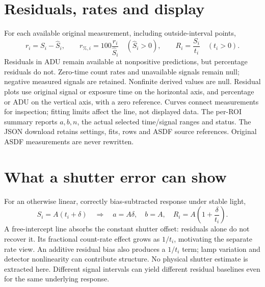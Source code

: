 \documentclass[11pt,a4paper]{article}
\begin{document}
\section{Residuals, rates and display}
For each available original measurement, including outside-interval points,
\[
 r_i=S_i-\widehat S_i,\qquad
 r_{\%,i}=100\frac{r_i}{\widehat S_i}\quad(\widehat S_i>0),\qquad
 R_i=\frac{S_i}{t_i}\quad(t_i>0).
\]
Residuals in ADU remain available at nonpositive predictions, but percentage
residuals do not. Zero-time count rates and unavailable signals remain null;
negative measured signals are retained. Nonfinite derived values are null.
Residual plots use original signal or exposure time on the horizontal axis, and
percentage or ADU on the vertical axis, with a zero reference. Curves connect
measurements for inspection; fitting limits affect the line, not displayed data.
The per-ROI summary reports $a,b,n$, the actual selected time/signal ranges and
status. The JSON download retains settings, fits, rows and ASDF source references.
Original ASDF measurements are never rewritten.

\section{What a shutter error can show}
For an otherwise linear, correctly bias-subtracted response under stable light,
\[
 S_i=A(t_i+\delta)\quad\Longrightarrow\quad a=A\delta,\quad b=A,
 \quad R_i=A\left(1+\frac{\delta}{t_i}\right).
\]
A free-intercept line absorbs the constant shutter offset: residuals alone do not
recover it. Its fractional count-rate effect grows as $1/t_i$, motivating the
separate rate view. An additive residual bias also produces a $1/t_i$ term;
lamp variation and detector nonlinearity can contribute structure. No physical
shutter estimate is extracted here. Different signal intervals can yield different
residual baselines even for the same underlying response.
\end{document}
